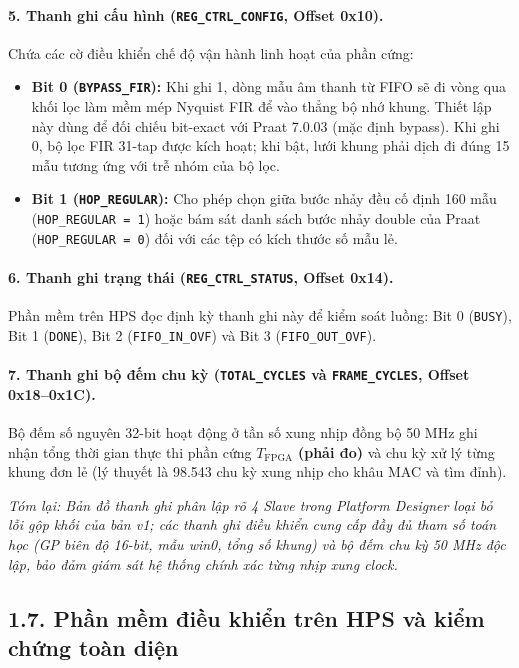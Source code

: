 \paragraph{5. Thanh ghi cấu hình (\texttt{REG\_CTRL\_CONFIG}, Offset 0x10).}
Chứa các cờ điều khiển chế độ vận hành linh hoạt của phần cứng:
\begin{itemize}[leftmargin=1.5em, itemsep=2pt]
    \item \textbf{Bit 0 (\texttt{BYPASS\_FIR}):} Khi ghi 1, dòng mẫu âm thanh từ FIFO sẽ đi vòng qua khối lọc làm mềm mép Nyquist FIR để vào thẳng bộ nhớ khung. Thiết lập này dùng để đối chiếu bit-exact với Praat 7.0.03 (mặc định bypass). Khi ghi 0, bộ lọc FIR 31-tap được kích hoạt; khi bật, lưới khung phải dịch đi đúng 15 mẫu tương ứng với trễ nhóm của bộ lọc.
    \item \textbf{Bit 1 (\texttt{HOP\_REGULAR}):} Cho phép chọn giữa bước nhảy đều cố định 160 mẫu (\texttt{HOP\_REGULAR = 1}) hoặc bám sát danh sách bước nhảy double của Praat (\texttt{HOP\_REGULAR = 0}) đối với các tệp có kích thước số mẫu lẻ.
\end{itemize}

\paragraph{6. Thanh ghi trạng thái (\texttt{REG\_CTRL\_STATUS}, Offset 0x14).}
Phần mềm trên HPS đọc định kỳ thanh ghi này để kiểm soát luồng: Bit 0 (\texttt{BUSY}), Bit 1 (\texttt{DONE}), Bit 2 (\texttt{FIFO\_IN\_OVF}) và Bit 3 (\texttt{FIFO\_OUT\_OVF}).

\paragraph{7. Thanh ghi bộ đếm chu kỳ (\texttt{TOTAL\_CYCLES} và \texttt{FRAME\_CYCLES}, Offset 0x18--0x1C).}
Bộ đếm số nguyên 32-bit hoạt động ở tần số xung nhịp đồng bộ 50 MHz ghi nhận tổng thời gian thực thi phần cứng $T_{\text{FPGA}}$ \textbf{(phải đo)} và chu kỳ xử lý từng khung đơn lẻ (lý thuyết là 98.543 chu kỳ xung nhịp cho khâu MAC và tìm đỉnh).

\textit{Tóm lại: Bản đồ thanh ghi phân lập rõ 4 Slave trong Platform Designer loại bỏ lỗi gộp khối của bản v1; các thanh ghi điều khiển cung cấp đầy đủ tham số toán học (GP biên độ 16-bit, mẫu win0, tổng số khung) và bộ đếm chu kỳ 50 MHz độc lập, bảo đảm giám sát hệ thống chính xác từng nhịp xung clock.}

\subsection*{1.7. Phần mềm điều khiển trên HPS và kiểm chứng toàn diện}

